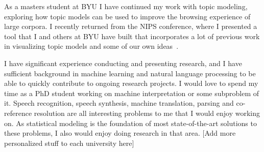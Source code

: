 \documentclass[onecolumn, 12pt]{article}
\begin{document}
As a masters student at BYU I have continued my work with topic modeling,
exploring how topic models can be used to improve the browsing experience of
large corpora.  I recently returned from the NIPS conference, where I presented
a tool that I and others at BYU have built that incorporates a lot of previous
work in visualizing topic models and some of our own
ideas~\cite{gardner-2010-topic-browser}.

I have significant experience conducting and presenting research, and I have
sufficient background in machine learning and natural language processing to be
able to quickly contribute to ongoing research projects.  I would love to spend
my time as a PhD student working on machine interpretation or some subproblem
of it.  Speech recognition, speech synthesis, machine translation, parsing and
co-reference resolution are all interesting problems to me that I would enjoy
working on.  As statistical modeling is the foundation of most state-of-the-art
solutions to these problems, I also would enjoy doing research in that area.
[Add more personalized stuff to each university here]

\vspace{2mm}
\footnotesize

\renewcommand\bibsection{\noindent \small\textbf{Publications}\vspace{-2mm}\footnotesize}

\end{document}
